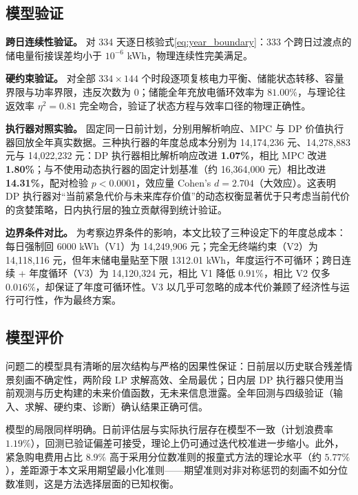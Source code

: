 \documentclass[zihao=-4,a4paper,UTF8,fontset=none]{ctexart}
\begin{document}
\subsection{模型验证}
\label{subsec:verify2}

\textbf{跨日连续性验证。} 对 334 天逐日核验式\eqref{eq:year_boundary}：333 个跨日过渡点的储电量衔接误差均小于 $10^{-6}$ kWh，物理连续性完美满足。

\textbf{硬约束验证。} 对全部 $334\times144$ 个时段逐项复核电力平衡、储能状态转移、容量界限与功率界限，违反次数为 0；储能全年充放电循环效率为 $81.00\%$，与理论往返效率 $\eta^2=0.81$ 完全吻合，验证了状态方程与效率口径的物理正确性。

\textbf{执行器对照实验。} 固定同一日前计划，分别用解析响应、MPC 与 DP 价值执行器回放全年真实数据。三种执行器的年度总成本分别为 14,174,236 元、14,278,883 元与 14,022,232 元：DP 执行器相比解析响应改进 \textbf{1.07\%}，相比 MPC 改进 \textbf{1.80\%}；与不使用动态执行器的固定计划基准（约 16,364,000 元）相比改进 \textbf{14.31\%}，配对检验 $p<0.0001$，效应量 Cohen's $d=2.704$（大效应）。这表明 DP 执行器对“当前紧急代价与未来库存价值”的动态权衡显著优于只考虑当前代价的贪婪策略，日内执行层的独立贡献得到统计验证。

\textbf{边界条件对比。} 为考察边界条件的影响，本文比较了三种设定下的年度总成本：每日强制回 6000 kWh（V1）为 14,249,906 元；完全无终端约束（V2）为 14,118,116 元，但年末储电量贴至下限 1312.01 kWh，年度运行不可循环；跨日连续 + 年度循环（V3）为 14,120,324 元，相比 V1 降低 $0.91\%$，相比 V2 仅多 $0.016\%$，却保证了年度可循环性。V3 以几乎可忽略的成本代价兼顾了经济性与运行可行性，作为最终方案。

\subsection{模型评价}

问题二的模型具有清晰的层次结构与严格的因果性保证：日前层以历史联合残差情景刻画不确定性，两阶段 LP 求解高效、全局最优；日内层 DP 执行器只使用当前观测与历史构建的未来价值函数，无未来信息泄露。全年回测与四级验证（输入、求解、硬约束、诊断）确认结果正确可信。

模型的局限同样明确。日前评估层与实际执行层存在模型不一致（计划浪费率 $1.19\%$），回测已验证偏差可接受，理论上仍可通过迭代校准进一步缩小。此外，紧急购电费用占比 $8.9\%$ 高于采用分位数准则的报童式方法的理论水平（约 $5.77\%$），差距源于本文采用期望最小化准则——期望准则对非对称惩罚的刻画不如分位数准则，这是方法选择层面的已知权衡。

\end{document}

